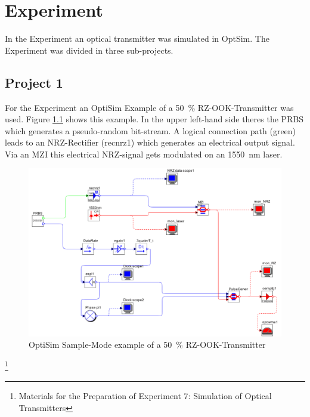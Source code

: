 \chapter{Experiment}
\label{ch:experiment}

In the Experiment an optical transmitter was simulated in OptSim. The Experiment was divided in three sub-projects.

\section{Project 1}
\label{sec:P1}
For the Experiment an OptiSim Example of a 50~\% RZ-OOK-Transmitter was used. Figure \ref{fig:P1_aufbau} shows this example\footnotemark[3]. In the upper left-hand side theres the PRBS which generates a pseudo-random bit-stream. A logical connection path (green) leads to an NRZ-Rectifier (recnrz1) which generates an electrical output signal. Via an MZI this electrical NRZ-signal gets modulated on an 1550~nm laser. 


\begin{figure}%
\includegraphics[width=\columnwidth]{Grafiken/P1_aufbau.jpg}%
\caption{OptiSim Sample-Mode example of a 50~\% RZ-OOK-Transmitter}%
\label{fig:P1_aufbau}%
\end{figure}


\footnote[3]{Materials for the Preparation of Experiment 7: Simulation of Optical Transmitters}
